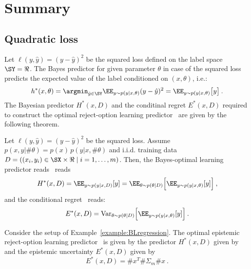 \section{Summary}



\subsection{Quadratic loss}
Let $\ell(y,\hat{y})=(y-\hat{y})^2$ be the squared loss defined on the label space $\SY=\Re$. 
%
The Bayes predictor for given parameter $\theta$ in case of the squared loss predicts the expected value of the label conditioned on $(x,\theta)$, i.e.:
\[
  h^*(x,\theta) = 
  \argmin_{\hat{y}\in\SY}\EE_{y\sim p(y\mid x,\theta)} (y-\hat{y})^2 = \EE_{y\sim p(y|x,\theta)}\big[ y\big ]\:.  %
\]
The Bayesian predictor $H^*(x,D)$ and the conditinal regret $E^*(x,D)$ required to construct the optimal reject-option learning predictor~ are given by the following theorem.

\begin{theorem}
Let $\ell(y,\hat{y})=(y-\hat{y})^2$ be the squared loss. Assume $p(x,y|\#\theta)=p(x)\,p(y|x,\#\theta)$ and i.i.d. training data $D=((x_i,y_i)\in\SX\times\Re\mid i=1,\ldots,m)$. Then, the Bayes-optimal learning predictor reads~ reads
\[
   H^*(x,D) = \EE_{y\sim p(y|x,D)}[y] 
   = \EE_{\theta\sim p(\theta|D)}\Big[\EE_{y\sim p(y|x,\theta)}[y] \Big ]\:,
\]
and the conditional regret~ reads:
\begin{equation}
\label{equ:CondRegretSquare}
   E^*(x,D) = 
   {\rm Var}_{\theta\sim p(\theta|D)} \Big [ \EE_{y\sim p(y|x,\theta)}[y] \Big ] \:.   
\end{equation}

\end{theorem}

\begin{example} 
Consider the setup of Example~\ref{example:BLregression}. The optimal epistemic reject-option learning predictor~ is given by the predictor $H^*(x,D)$ given by~ and the epistemic uncertainty $E^*(x,D)$ given by
\[
    E^*(x,D) = \#x^T \#\Sigma_m\#x \:.
\]
    
\end{example}


